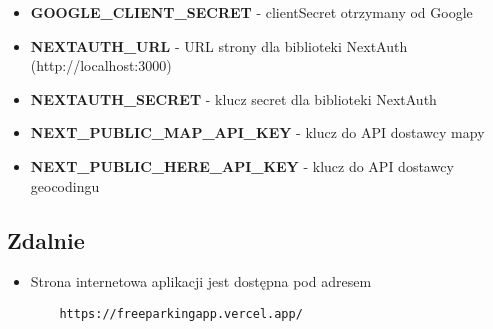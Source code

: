\documentclass{article}
\begin{document}
\begin{itemize}
\begin{itemize}
                \item \textbf{GOOGLE\_CLIENT\_SECRET} - clientSecret otrzymany od Google
                \item \textbf{NEXTAUTH\_URL} - URL strony dla biblioteki NextAuth (http://localhost:3000)
                \item \textbf{NEXTAUTH\_SECRET} - klucz secret dla biblioteki NextAuth
                \item \textbf{NEXT\_PUBLIC\_MAP\_API\_KEY} - klucz do API dostawcy mapy
                \item \textbf{NEXT\_PUBLIC\_HERE\_API\_KEY} - klucz do API dostawcy geocodingu
            \end{itemize}
        \end{itemize}
            

            \subsection{Zdalnie}
            \begin{itemize}
                \item Strona internetowa aplikacji jest dostępna pod adresem 
                    \begin{lstlisting}
    https://freeparkingapp.vercel.app/
                    \end{lstlisting}
            \end{itemize}
\end{document}
